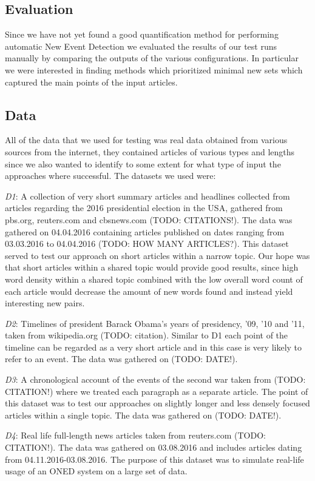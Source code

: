 \subsection{Evaluation}
Since we have not yet found a good quantification method for performing automatic New Event Detection we evaluated the results of our test runs manually by comparing the outputs of the various configurations. In particular we were interested in finding methods which prioritized minimal new sets which captured the main points of the input articles. 

\subsection{Data}
All of the data that we used for testing was real data obtained from various sources from the internet, they contained articles of various types and lengths since we also wanted to identify to some extent for what type of input the approaches where successful. The datasets we used were:

\emph{D1}: A collection of very short summary articles and headlines collected from articles regarding the 2016 presidential election in the USA, gathered from pbs.org, reuters.com and cbsnews.com (TODO: CITATIONS!). The data was gathered on 04.04.2016 containing articles published on dates ranging from 03.03.2016 to 04.04.2016 (TODO: HOW MANY ARTICLES?). This dataset served to test our approach on short articles within a narrow topic. Our hope was that short articles within a shared topic would provide good results, since high word density within a shared topic combined with the low overall word count of each article would decrease the amount of new words found and instead yield interesting new pairs.

\emph{D2}: Timelines of president Barack Obama's years of presidency, '09, '10 and '11, taken from wikipedia.org (TODO: citation). Similar to D1 each point of the timeline can be regarded as a very short article and in this case is very likely to refer to an event. The data was gathered on (TODO: DATE!).

\emph{D3}: A chronological account of the events of the second war taken from (TODO: CITATION!) where we treated each paragraph as a separate article. The point of this dataset was to test our approaches on slightly longer and less densely focused articles within a single topic. The data was gathered on (TODO: DATE!).

\emph{D4}: Real life full-length news articles taken from reuters.com (TODO: CITATION!). The data was gathered on 03.08.2016 and includes articles dating from 04.11.2016-03.08.2016. The purpose of this dataset was to simulate real-life usage of an ONED system on a large set of data.
